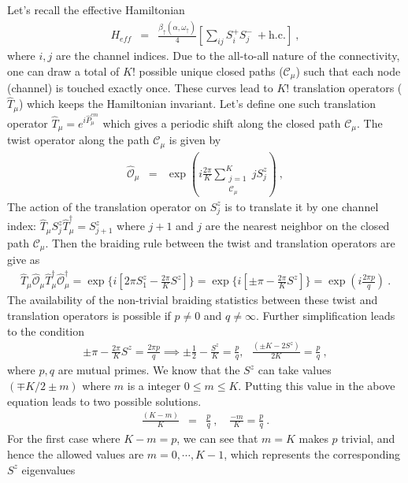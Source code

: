\documentclass[12pt]{iopart}
\begin{document}
Let's recall the effective Hamiltonian
\begin{eqnarray}
H_{eff} &=& \frac{\beta_{\uparrow}(\alpha,\omega_{\uparrow})}{4} \left[ \displaystyle\sum_{ij} S_i^+S_j^- ~+ \textrm{h.c.} \right]~,
\end{eqnarray}
where $i,j$ are the channel indices. Due to the all-to-all nature of the connectivity, one can draw a total of $K!$ possible unique closed paths ($\mathcal{C}_{\mu}$) such that each node (channel) is touched exactly once. These curves lead to $K!$ translation operators ($\hat{T}_{\mu}$) which keeps the Hamiltonian invariant. Let's define one such translation operator $\hat{T}_{\mu}=e^{i\hat{P}^{cm}_{{\mu}}}$ which gives a periodic shift along the closed path $\mathcal{C}_{\mu}$. The twist operator along the path $\mathcal{C}_{\mu}$ is given by
\begin{eqnarray}
\hat{\mathcal{O}}_{\mu} &=& \exp({i\frac{2\pi}{K} \displaystyle\sum_{\substack{j=1\\ \mathcal{C}_{\mu}}}^{K} j S_j^z} )~,
\end{eqnarray}
The action of the translation operator on \(S_j^z\) is to translate it by one channel index: $\hat{T}_{\mu} S_j^z \hat T^\dagger_\mu = S_{j+1}^z$ where $j+1$ and $j$ are the nearest neighbor on the closed path $\mathcal{C}_{\mu}$. Then the braiding rule between the twist and translation operators are give as
\begin{eqnarray}
\hat{T}_{\mu}\hat{\mathcal{O}}_{\mu} \hat{T}^{\dagger}_{\mu} \hat{\mathcal{O}}_{\mu}^{\dagger} = \exp\{i[2\pi S_1^z-\frac{2\pi}{K}S^z]\} = \exp\{i[\pm \pi - \frac{2\pi}{K} S^z]\} =\exp(i\frac{2\pi p}{q})~.
\end{eqnarray}
The availability of the non-trivial braiding statistics between these twist and translation operators is possible if $p\neq 0$ and $q\neq \infty$. Further simplification leads to the condition
\begin{eqnarray}
 \pm\pi -\frac{2\pi}{K} S^z = \frac{2\pi p}{q} \implies  \pm\frac{1}{2}-\frac{S^z}{K} = \frac{p}{q} , ~ ~ ~ \frac{(\pm K-2S^z)}{2K} = \frac{p}{q}~,
\end{eqnarray} 
where $p,q$ are mutual primes. We know that the $S^z$ can take values $(\mp K/2\pm m)$ where $m$ is a integer $0 \leq m \leq K$. Putting this value in the above equation leads to two possible solutions.
\begin{eqnarray}
\frac{(K-m)}{K} &=& \frac{p}{q} ~,\quad \frac{-m}{K}=\frac{p}{q}~.
\end{eqnarray}
For the first case where $K-m=p$, we can see that $m=K$ makes $p$ trivial, and hence the allowed values are $m=0,\cdots,K-1$, which represents the corresponding $S^z$ eigenvalues 
\end{document}
